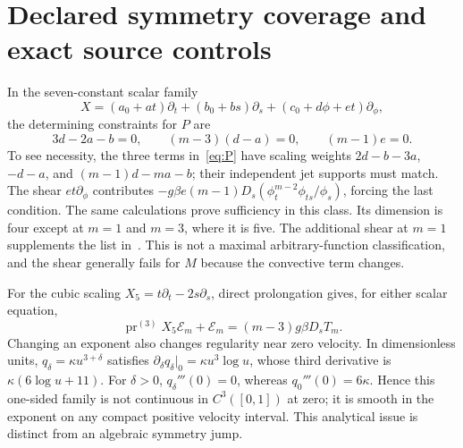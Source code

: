 \documentclass[12pt,a4paper,oneside]{report}
\numberwithin{equation}{chapter}
\theoremstyle{remark}\newtheorem{remark}[theorem]{Remark}
\newcommand{\E}{\mathcal E}
\newcommand{\pr}{\operatorname{pr}}
\begin{document}
\section{Declared symmetry coverage and exact source controls}
In the seven-constant scalar family
\begin{equation}
 X=(a_0+at)\partial_t+(b_0+bs)\partial_s
       +(c_0+d\phi+et)\partial_\phi,
\end{equation}
the determining constraints for $P$ are
\begin{equation}\label{eq:scalar-affine}
 3d-2a-b=0,\qquad(m-3)(d-a)=0,\qquad(m-1)e=0.
\end{equation}
To see necessity, the three terms in~\eqref{eq:P} have scaling weights
$2d-b-3a$, $-d-a$, and $(m-1)d-ma-b$; their independent jet supports
must match. The shear $et\partial_\phi$ contributes
$-g\beta e(m-1)D_s(\phi_t^{m-2}\phi_{ts}/\phi_s)$, forcing the last
condition. The same calculations prove sufficiency in this class.
Its dimension is four except at $m=1$ and $m=3$, where it is five. The
additional shear at $m=1$ supplements the list in~\cite[Proposition~1]{ap}.
This is not a maximal arbitrary-function classification, and the shear
generally fails for $M$ because the convective term changes.

For the cubic scaling $X_5=t\partial_t-2s\partial_s$, direct prolongation
gives, for either scalar equation,
\begin{equation}
 \pr^{(3)}X_5\E_m+\E_m=(m-3)g\beta D_sT_m.
\end{equation}
Changing an exponent also changes regularity near zero velocity. In
dimensionless units, $q_\delta=\kappa u^{3+\delta}$ satisfies
$\partial_\delta q_\delta|_0=\kappa u^3\log u$, whose third derivative is
$\kappa(6\log u+11)$. For $\delta>0$, $q_\delta'''(0)=0$, whereas
$q_0'''(0)=6\kappa$. Hence this one-sided family is not continuous in
$C^3([0,1])$ at zero; it is smooth in the exponent on any compact positive
velocity interval. This analytical issue is distinct from an algebraic
symmetry jump.
\end{document}
